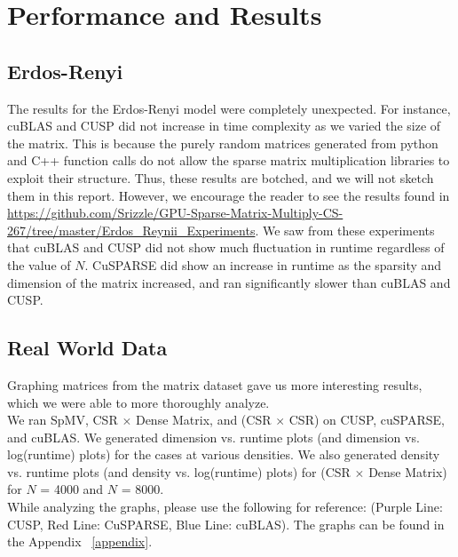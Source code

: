 \documentclass[12pt]{article}
\begin{document}
\section{Performance and Results}


\subsection{Erdos-Renyi}
\hspace{0.5cm}The results for the Erdos-Renyi model were completely unexpected. For instance, cuBLAS and CUSP did not increase in time complexity as we varied the size of the matrix. This is because the purely random matrices generated  from python and C++ function calls do not allow the sparse matrix multiplication libraries to exploit their structure. Thus, these results are botched, and we will not sketch them in this report. However, we encourage the reader to see the results found in \url{https://github.com/Srizzle/GPU-Sparse-Matrix-Multiply-CS-267/tree/master/Erdos_Reynii_Experiments}. We saw from these experiments that cuBLAS and CUSP did not show much fluctuation in runtime regardless of the value of $N$. CuSPARSE did show an increase in runtime as the sparsity and dimension of the matrix increased, and ran significantly slower than cuBLAS and CUSP. 

\subsection{Real World Data}
\hspace{0.5cm}Graphing matrices from the matrix dataset gave us more interesting results, which we were able to more thoroughly analyze.\\
We ran  SpMV, CSR $\times$ Dense Matrix, and (CSR $\times$ CSR) on CUSP, cuSPARSE, and cuBLAS. We generated dimension vs. runtime plots (and dimension vs. log(runtime) plots) for the cases at various densities. We also generated density vs. runtime plots (and density vs. log(runtime) plots) for (CSR $\times$ Dense Matrix) for $N$ = 4000 and $N$ = 8000.\\ While analyzing the graphs, please use the following for reference:
(Purple Line: CUSP, Red Line: CuSPARSE, Blue Line: cuBLAS). The graphs can be found in the Appendix ~\ref{appendix}.
\end{document}
